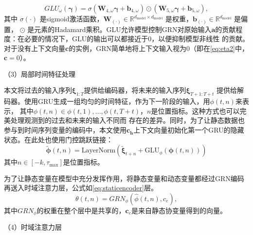 \begin{equation}
    GLU_{\omega}(\boldsymbol{\gamma }) = \sigma(\mathbf{W}_{4,\omega} \mathbf{\boldsymbol{\gamma }} + \mathbf{b}_{4,\omega}) \odot (\mathbf{W}_{5,\omega} \mathbf{\boldsymbol{\gamma }} + \mathbf{b}_{5,\omega}),
\end{equation}
其中 $\sigma(\cdot)$ 是sigmoid激活函数，$\mathbf{W}_{(\cdot)} \in \mathbb{R}^{d_{\text{model}} \times d_{\text{model}}}$ 是权重，$\mathbf{b}_{(\cdot)} \in \mathbb{R}^{d_{\text{model}}}$ 是偏置，
$\odot $ 是元素的Hadamard乘积。GLU允许模型控制GRN对原始输入$\mathbf{a}$的贡献程度：在必要的情况下，GLU的输出可以都接近于0，以便抑制模型非线性
的贡献。对于没有上下文向量$\mathbf{c}$的实例，GRN简单地将上下文输入视为0（即在\eqref{eq:eta2}中，$\mathbf{c}=0$）。

（3）局部时间特征处理

本文将过去的输入序列$\bm{\xi}_{1:T}$提供给编码器，将未来的输入序列$\bm{\xi}_{T+1:T+t}$
提供给解码器。使用GRU生成一组均匀的时间特征，作为下一阶段的输入，用$\phi (t,n)$来表示，
其中$\phi(t,n) \in {\phi(t, 1), \ldots, \phi(t, T+t)}$，$n$是位置指标。这种方式也可以完美处理观测到的过去和未来的输入不同而
存在的差异。同时，为了让静态数据也参与到时间序列变量的编码中，本文使用$\mathbf{c_h}$上下文向量初始化第一个GRU的隐藏状态。在此处也使用门控跳跃链接：
\begin{equation}
    \tilde{\bm{\phi}}(t, n) = \text{LayerNorm}\left(\tilde{\bm{\xi}}_{t+n} + \text{GLU}_{\phi}(\bm{\phi}(t, n))\right)
\end{equation}
其中$n \in [ -k, \tau_{\max}]$是位置指标。

为了让静态变量在模型中充分发挥作用，将静态变量和动态变量都经过GRN编码再送入时域注意力层，公式如\eqref{eq:staticencoder}层。
\begin{equation}
    \theta(t, n) = GRN_{\phi}(\hat{\phi}(t, n), c_e),
    \label{eq:staticencoder}
\end{equation}
其中$GRN_{\phi}$的权重在整个层中是共享的，$\mathbf{c}_e$是来自静态协变量得到的向量。

（4）时域注意力层

